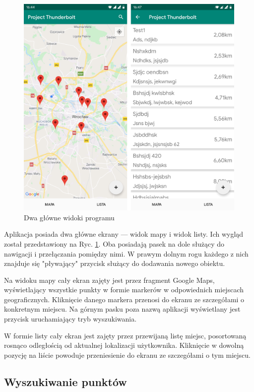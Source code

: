 \documentclass[polish,polish,a4paper,12pt]{article}
\begin{document}
	\begin{figure}[H]
		\centering
		\includegraphics[width = \textwidth]{screenshot-main}
		\caption{Dwa główne widoki programu}
		\label{fig:screenshotmain}
	\end{figure}

	Aplikacja posiada dwa główne ekrany — widok mapy i widok listy. Ich wygląd został przedstawiony na Ryc. \ref{fig:screenshotmain}. Oba posiadają pasek na dole służący do nawigacji i przełączania pomiędzy nimi. W prawym dolnym rogu każdego z nich znajduje się "pływający" przycisk służący do dodawania nowego obiektu.

	Na widoku mapy cały ekran zajęty jest przez fragment Google Maps, wyświetlający wszystkie punkty w formie markerów w odpowiednich miejscach geograficznych. Kliknięcie danego markera przenosi do ekranu ze szczegółami o konkretnym miejscu. Na górnym pasku poza nazwą aplikacji wyświetlany jest przycisk uruchamiający tryb wyszukiwania.

	W formie listy cały ekran jest zajęty przez przewijaną listę miejsc, posortowaną rosnąco odległością od aktualnej lokalizacji użytkownika. Kliknięcie w dowolną pozycję na liście powoduje przeniesienie do ekranu ze szczegółami o tym miejscu.

	\subsection{Wyszukiwanie punktów}
\end{document}
